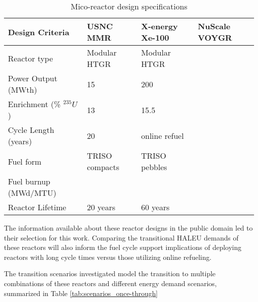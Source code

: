 \begin{table}[ht]
    \centering
    \caption{Mico-reactor design specifications}
    \label{tab:reactor_summary}
    \begin{tabular}{p{5cm}p{3cm}p{3cm}p{3cm}}
        \hline
        Design Criteria & \gls{USNC} \gls{MMR} & 
            X-energy Xe-100 & NuScale VOYGR \\\hline
        Reactor type & Modular HTGR & Modular HTGR & \\
        Power Output (MWth) & 15 & 200 & \\
        Enrichment (\% $^{235}U$) & 13 & 15.5 & \\
        Cycle Length (years) & 20 & online refuel &\\
        Fuel form & \gls{TRISO} compacts & \gls{TRISO} pebbles &\\
        Fuel burnup (MWd/MTU) & & & \\
        Reactor Lifetime & 20 years & 60 years & \\
        \hline
    \end{tabular}
\end{table}
    
The information available about these reactor designs in the public 
domain led to their selection for this work. Comparing the transitional \gls{HALEU} 
demands of these reactors will also inform the fuel cycle support 
implications of deploying reactors with long cycle 
times versus those utilizing online refueling. 

The transition scenarios investigated model the transition to multiple 
combinations of these reactors and different energy demand scenarios, 
summarized in Table \ref{tab:scenarios_once-through}

